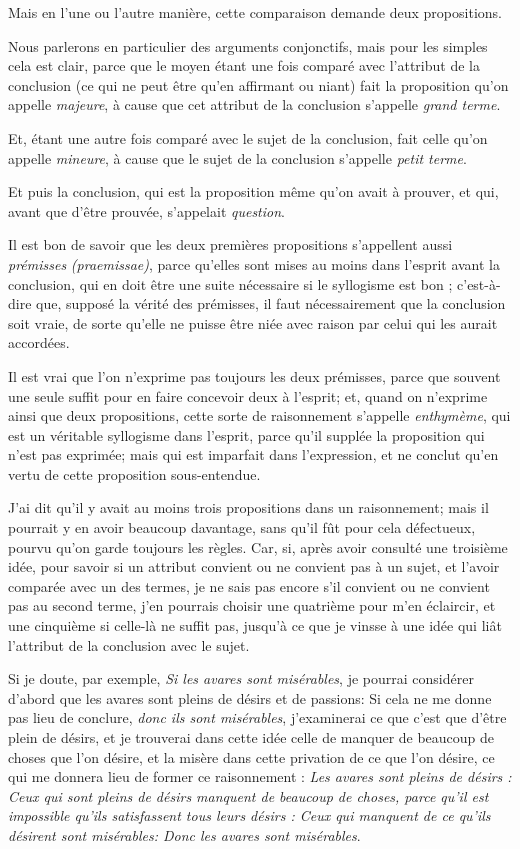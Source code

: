 Mais en l'une ou l'autre manière, cette comparaison demande deux propositions.

Nous parlerons en particulier des arguments conjonctifs, mais pour les simples cela est clair, parce que le moyen étant une fois comparé avec l'attribut de la conclusion (ce qui ne peut être qu'en affirmant ou niant) fait la proposition qu'on appelle \emph{majeure}, à cause que cet attribut de la conclusion s'appelle \emph{grand terme}.

Et, étant une autre fois comparé avec le sujet de la conclusion, fait celle qu'on appelle \emph{mineure}, à cause que le sujet de la conclusion s'appelle \emph{petit terme}.

Et puis la conclusion, qui est la proposition même qu'on avait à prouver, et qui, avant que d'être prouvée, s'appelait \emph{question}.

Il est bon de savoir que les deux premières propositions s'appellent aussi \emph{prémisses} \emph{(praemissae)}, parce qu'elles sont mises au moins dans l'esprit avant la conclusion, qui en doit être une suite nécessaire si le syllogisme est bon ; c'est-à-dire que, supposé la vérité des prémisses, il faut nécessairement que la conclusion soit vraie, de sorte qu'elle ne puisse être niée avec raison par celui qui les aurait accordées.

Il est vrai que l'on n'exprime pas toujours les deux prémisses, parce que souvent une seule suffit pour en faire concevoir deux à l'esprit; et, quand on n'exprime ainsi que deux propositions, cette sorte de raisonnement s'appelle \emph{enthymème}, qui est un véritable syllogisme dans l'esprit, parce qu'il supplée la proposition qui n'est pas exprimée; mais qui est imparfait dans l'expression, et ne conclut qu'en vertu de cette proposition sous-entendue.

J'ai dit qu'il y avait au moins trois propositions dans un raisonnement; mais il pourrait y en avoir beaucoup davantage, sans qu'il fût pour cela défectueux, pourvu qu'on garde toujours les règles. Car, si, après avoir consulté une troisième idée, pour savoir si un attribut convient ou ne convient pas à un sujet, et l'avoir comparée avec un des termes, je ne sais pas encore s'il convient ou ne convient pas au second terme, j'en pourrais choisir une quatrième pour m'en éclaircir, et une cinquième si celle-là ne suffit pas, jusqu'à ce que je vinsse à une idée qui liât l'attribut de la conclusion avec le sujet.

Si je doute, par exemple, \emph{Si les avares sont misérables}, je pourrai considérer d'abord que les avares sont pleins de désirs et de passions: Si cela ne me donne pas lieu de conclure, \emph{donc ils sont misérables}, j'examinerai ce que c'est que d'être plein de désirs, et je trouverai dans cette idée celle de manquer de beaucoup de choses que l'on désire, et la misère dans cette privation de ce que l'on désire, ce qui me donnera lieu de former ce raisonnement : \emph{Les avares sont pleins de désirs : Ceux qui sont pleins de désirs manquent de beaucoup de choses, parce qu'il est impossible qu'ils satisfassent tous leurs désirs : Ceux qui manquent de ce qu'ils désirent sont misérables: Donc les avares sont misérables}.

